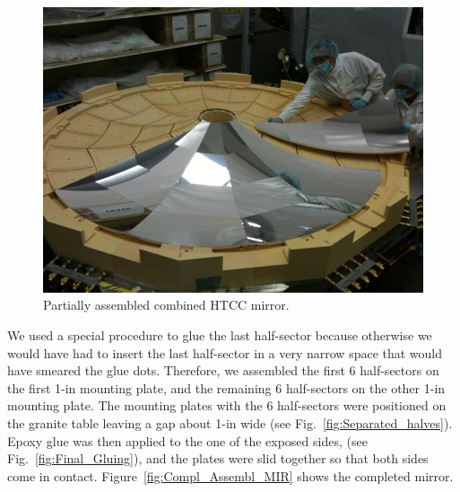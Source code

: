  \begin{figure}[ht]
    \centering
    \includegraphics[width=1.0\linewidth]{images/Partial_Assembl_MIR.jpg}
    \caption{ Partially assembled combined HTCC mirror.}
    \label{fig:Partial_Assembl_MIR}
\end{figure}


We used a special procedure to glue the last half-sector because otherwise we would have had to insert the last
half-sector in a very narrow space that would have smeared the glue dots. Therefore, we assembled the first 6
half-sectors on the first 1-in mounting plate, and the remaining 6 half-sectors on the other 1-in mounting plate.
The mounting plates with the 6 half-sectors were positioned on the granite table leaving a gap about 1-in wide
(see Fig.~\ref{fig:Separated_halves}). Epoxy glue was then applied to the one of the exposed sides, (see
Fig.~\ref{fig:Final_Gluing}), and the plates were slid together so that both sides come in contact.
Figure~\ref{fig:Compl_Assembl_MIR} shows the completed mirror. 
 
